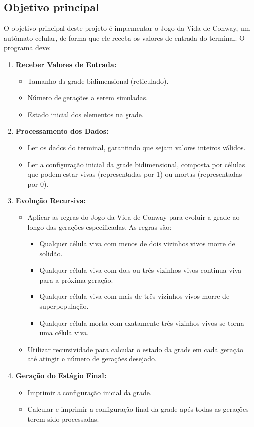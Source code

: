 \documentclass{article}
\begin{document}
\subsection{Objetivo principal}

O objetivo principal deste projeto é implementar o Jogo da Vida de Conway, um autômato celular, de forma que ele receba os valores de entrada do terminal. O programa deve:

\begin{enumerate}
    \item \textbf{Receber Valores de Entrada:}
    \begin{itemize}
        \item Tamanho da grade bidimensional (reticulado).
        \item Número de gerações a serem simuladas.
        \item Estado inicial dos elementos na grade.
    \end{itemize}
    \item \textbf{Processamento dos Dados:}
    \begin{itemize}
        \item Ler os dados do terminal, garantindo que sejam valores inteiros válidos.
        \item Ler a configuração inicial da grade bidimensional, composta por células que podem estar vivas (representadas por 1) ou mortas (representadas por 0).
    \end{itemize}
    \item \textbf{Evolução Recursiva:}
    \begin{itemize}
        \item Aplicar as regras do Jogo da Vida de Conway para evoluir a grade ao longo das gerações especificadas. As regras são:
        \begin{itemize}
            \item Qualquer célula viva com menos de dois vizinhos vivos morre de solidão.
            \item Qualquer célula viva com dois ou três vizinhos vivos continua viva para a próxima geração.
            \item Qualquer célula viva com mais de três vizinhos vivos morre de superpopulação.
            \item Qualquer célula morta com exatamente três vizinhos vivos se torna uma célula viva.
        \end{itemize}
        \item Utilizar recursividade para calcular o estado da grade em cada geração até atingir o número de gerações desejado.
    \end{itemize}
    \item \textbf{Geração do Estágio Final:}
    \begin{itemize}
        \item Imprimir a configuração inicial da grade.
        \item Calcular e imprimir a configuração final da grade após todas as gerações terem sido processadas.
    \end{itemize}
\end{enumerate}
 
\end{document}
